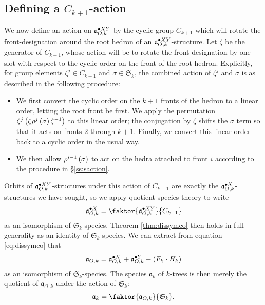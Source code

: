\documentclass[sectionflow,singlespace,twoside,boldmathhdr]{brandiss} %
\numberwithin{section}{chapter}
\numberwithin{figure}{chapter}
\begin{document}
\subsection{Defining a $C_{k+1}$-action}\label{ss:zaction}
We now define an action on $\pointed[XY]{\mathfrak{a}}_{O, k}$ by the cyclic group $C_{k+1}$ which will rotate the front-designation around the root hedron of an $\pointed[XY]{\mathfrak{a}}_{O, k}$-structure.
Let $\zeta$ be the generator of $C_{k+1}$, whose action will be to rotate the front-designation by one slot with respect to the cyclic order on the front of the root hedron.
Explicitly, for group elements $\zeta^{j} \in C_{k+1}$ and $\sigma \in \mathfrak{S}_{k}$, the combined action of $\zeta^{j}$ and $\sigma$ is as described in the following procedure:
\begin{itemize}
\item We first convert the cyclic order on the $k+1$ fronts of the hedron to a linear order, letting the root front be first.
  We apply the permutation $\zeta^{j} \pbrac{\zeta \rho^{j} \pbrac{\sigma} \zeta^{-1}}$ to this linear order; the conjugation by $\zeta$ shifts the $\sigma$ term so that it acts on fronts $2$ through $k+1$.
  Finally, we convert this linear order back to a cyclic order in the usual way.  
\item We then allow $\rho^{i - 1} \pbrac{\sigma}$ to act on the hedra attached to front $i$ according to the procedure in \S \ref{ss:saction}.
\end{itemize}
Orbits of $\pointed[XY]{\mathfrak{a}}_{O, k}$-structures under this action of $C_{k+1}$ are exactly the $\pointed[X]{\mathfrak{a}}_{O, k}$-structures we have sought, so we apply quotient species theory to write
\begin{equation}
  \label{eq:cycquot}
  \pointed[X]{\mathfrak{a}}_{O, k} = \faktor{\pointed[XY]{\mathfrak{a}}_{O, k}}{C_{k+1}}
\end{equation}
as an isomorphism of $\mathfrak{S}_{k}$-species.
Theorem \ref{thm:dissymco} then holds in full generality as an identity of $\mathfrak{S}_{k}$-species.
We can extract from equation \eqref{eq:dissymco} that
\begin{equation}
  \label{eq:coskextract}
  \mathfrak{a}_{O, k} = \pointed[X]{\mathfrak{a}}_{O, k} + \pointed[Y]{\mathfrak{a}}_{O, k} - \pbrac{F_{k} \cdot H_{k}}
\end{equation}
as an isomorphism of $\mathfrak{S}_{k}$-species.
The species $\mathfrak{a}_{k}$ of $k$-trees is then merely the quotient of $\mathfrak{a}_{O, k}$ under the action of $\mathfrak{S}_{k}$:
\begin{equation}
  \label{eq:ktreesquot}
  \mathfrak{a}_{k} = \faktor{\mathfrak{a}_{O, k}}{\mathfrak{S}_{k}}.
\end{equation}
\end{document}
